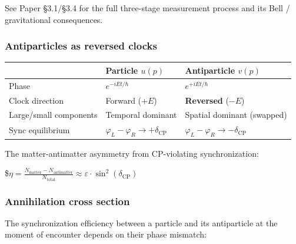 \documentclass[
]{article}
\newcounter{none} %
\begin{document}
See Paper §3.1/§3.4 for the full three-stage measurement process and its
Bell / gravitational consequences.

\subsubsection{Antiparticles as reversed
clocks}\label{antiparticles-as-reversed-clocks}

{\def\LTcaptype{none} %
\begin{longtable}[]{@{}
  >{\raggedright\arraybackslash}p{}
  >{\raggedright\arraybackslash}p{}
  >{\raggedright\arraybackslash}p{}@{}}
\toprule\noalign{}
\begin{minipage}[b]{\linewidth}\raggedright
\end{minipage} & \begin{minipage}[b]{\linewidth}\raggedright
Particle \(u(p)\)
\end{minipage} & \begin{minipage}[b]{\linewidth}\raggedright
Antiparticle \(v(p)\)
\end{minipage} \\
\midrule\noalign{}
\endhead
\bottomrule\noalign{}
\endlastfoot
Phase & \(e^{-iEt/\hbar}\) & \(e^{+iEt/\hbar}\) \\
Clock direction & Forward (\(+E\)) & \textbf{Reversed} (\(-E\)) \\
Large/small components & Temporal dominant & Spatial dominant
(swapped) \\
Sync equilibrium & \(\varphi_L - \varphi_R \to +\delta_{\text{CP}}\) &
\(\varphi_L - \varphi_R \to -\delta_{\text{CP}}\) \\
\end{longtable}
}

The matter-antimatter asymmetry from CP-violating synchronization:

\$\(\eta = \frac{N_{\text{matter}} - N_{\text{antimatter}}}{N_{\text{total}}} \approx \varepsilon \cdot \sin^2(\delta_{\text{CP}})\)

\subsubsection{Annihilation cross
section}\label{annihilation-cross-section}

The synchronization efficiency between a particle and its antiparticle
at the moment of encounter depends on their phase mismatch:
\end{document}
